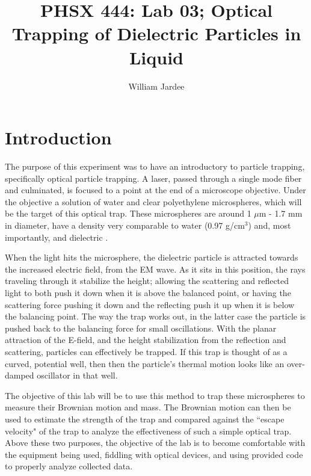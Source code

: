 \documentclass[12pt]{article}
\begin{document}
\title{PHSX 444: Lab 03; Optical Trapping of Dielectric Particles in Liquid}
\author{William Jardee}
\maketitle

\section{Introduction}
The purpose of this experiment was to have an introductory to particle trapping, specifically optical particle trapping. A laser, passed through a single mode fiber and culminated, is focused to a point at the end of a microscope objective. Under the objective a solution of water and clear polyethylene microspheres, which will be the target of this optical trap. These microspheres are around 1 $\mu$m - 1.7 mm in diameter, have a density very comparable to water (0.97 g/cm$^3$) and, most importantly, and dielectric \cite{microspheres}. 

When the light hits the microsphere, the dielectric particle is attracted towards the increased electric field, from the EM wave. As it sits in this position, the rays traveling through it stabilize the height; allowing the scattering and reflected light to both push it down when it is above the balanced point, or having the scattering force pushing it down and the reflecting push it up when it is below the balancing point. The way the trap works out, in the latter case the particle is pushed back to the balancing force for small oscillations. With the planar attraction of the E-field, and the height stabilization from the reflection and scattering, particles can effectively be trapped. If this trap is thought of as a curved,  potential well, then then the particle's thermal motion looks like an over-damped oscillator in that well.

The objective of this lab will be to use this method to trap these microspheres to measure their Brownian motion and mass. The Brownian motion can then be used to estimate the strength of the trap and compared against the ``escape velocity" of the trap to analyze the effectiveness of such a simple optical trap. Above these two purposes, the objective of the lab is to become comfortable with the equipment being used, fiddling with optical devices, and using provided code to properly analyze collected data.
\end{document}
